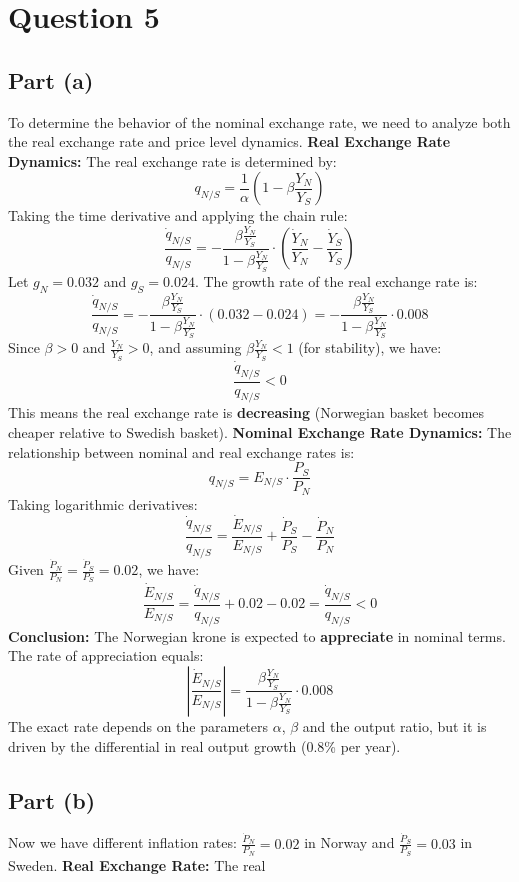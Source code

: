 \section{Question 5} \subsection{Part (a)} To determine the behavior of the
nominal exchange rate, we need to analyze both the real exchange rate and price
level dynamics. \textbf{Real Exchange Rate Dynamics:} The real exchange rate is
determined by: \[ q_{N/S} = \frac{1}{\alpha} \left( 1 - \beta \frac{Y_N}{Y_S}
\right) \] Taking the time derivative and applying the chain rule: \[
\frac{\dot{q}_{N/S}}{q_{N/S}} = -\frac{\beta \frac{Y_N}{Y_S}}{1 - \beta
\frac{Y_N}{Y_S}} \cdot \left( \frac{\dot{Y}_N}{Y_N} - \frac{\dot{Y}_S}{Y_S}
\right) \] Let $g_N = 0.032$ and $g_S = 0.024$. The growth rate of the real
exchange rate is: \[ \frac{\dot{q}_{N/S}}{q_{N/S}} = -\frac{\beta
\frac{Y_N}{Y_S}}{1 - \beta \frac{Y_N}{Y_S}} \cdot (0.032 - 0.024) = -\frac{\beta
\frac{Y_N}{Y_S}}{1 - \beta \frac{Y_N}{Y_S}} \cdot 0.008 \] Since $\beta > 0$ and
$\frac{Y_N}{Y_S} > 0$, and assuming $\beta \frac{Y_N}{Y_S} < 1$ (for stability),
we have: \[ \frac{\dot{q}_{N/S}}{q_{N/S}} < 0 \] This means the real exchange
rate is \textbf{decreasing} (Norwegian basket becomes cheaper relative to
Swedish basket). \textbf{Nominal Exchange Rate Dynamics:} The relationship
between nominal and real exchange rates is: \[ q_{N/S} = E_{N/S} \cdot
\frac{P_S}{P_N} \] Taking logarithmic derivatives: \[
\frac{\dot{q}_{N/S}}{q_{N/S}} = \frac{\dot{E}_{N/S}}{E_{N/S}} +
\frac{\dot{P}_S}{P_S} - \frac{\dot{P}_N}{P_N} \] Given $\frac{\dot{P}_N}{P_N} =
\frac{\dot{P}_S}{P_S} = 0.02$, we have: \[ \frac{\dot{E}_{N/S}}{E_{N/S}} =
\frac{\dot{q}_{N/S}}{q_{N/S}} + 0.02 - 0.02 = \frac{\dot{q}_{N/S}}{q_{N/S}} < 0
\] \textbf{Conclusion:} The Norwegian krone is expected to \textbf{appreciate}
in nominal terms. The rate of appreciation equals: \[
\left|\frac{\dot{E}_{N/S}}{E_{N/S}}\right| = \frac{\beta \frac{Y_N}{Y_S}}{1 -
\beta \frac{Y_N}{Y_S}} \cdot 0.008 \] The exact rate depends on the parameters
$\alpha$, $\beta$ and the output ratio, but it is driven by the differential in
real output growth (0.8\% per year). \subsection{Part (b)} Now we have different
inflation rates: $\frac{\dot{P}_N}{P_N} = 0.02$ in Norway and
$\frac{\dot{P}_S}{P_S} = 0.03$ in Sweden. \textbf{Real Exchange Rate:} The real
